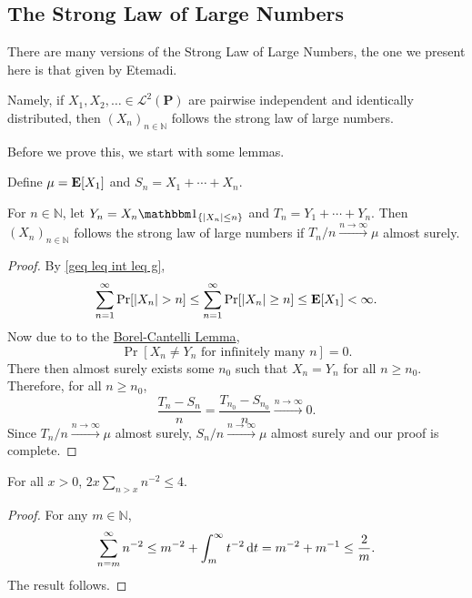 \subsection{The Strong Law of Large Numbers}

There are many versions of the Strong Law of Large Numbers, the one we present here is that given by Etemadi.

Namely, if $X_1,X_2,\ldots\in\mathcal{L}^2(\textbf{P})$ are pairwise independent and identically distributed, then $(X_n)_{n\in\mathbb{N}}$ follows the strong law of large numbers.

Before we prove this, we start with some lemmas.

Define $\mu=\textbf{E}[X_1]$ and $S_n=X_1+\cdots+X_n$.

\begin{lemma}
\label{prlem1etem}
    For $n\in\mathbb{N}$, let $Y_n=X_n\indic_{\{|X_n|\leq n\}}$ and $T_n=Y_1+\cdots+Y_n$. Then $(X_n)_{n\in\mathbb{N}}$ follows the strong law of large numbers if $T_n/n\xrightarrow{n\to\infty}\mu$ almost surely.
\end{lemma}
\begin{proof}
    By \cref{geq leq int leq g}, $$\sum_{n=1}^\infty \Pr[|X_n|> n]\leq\sum_{n=1}^\infty \Pr[|X_n|\geq n]\leq\expec[X_1]<\infty.$$ Now due to to the \hyperref[borelCantelliLemma]{Borel-Cantelli Lemma},
    $$\Pr[X_n\neq Y_n\text{ for infinitely many $n$}]=0.$$
    There then almost surely exists some $n_0$ such that $X_n=Y_n$ for all $n\geq n_0$. Therefore, for all $n\geq n_0$,
    $$\frac{T_n-S_n}{n} = \frac{T_{n_0}-S_{n_0}}{n}\xrightarrow{n\to\infty}0.$$
    Since $T_n/n\xrightarrow{n\to\infty}\mu$ almost surely, $S_n/n\xrightarrow{n\to\infty}\mu$ almost surely and our proof is complete.
\end{proof}

\begin{lemma}
    For all $x>0$, $2x\sum_{n>x}n^{-2}\leq 4$.
\end{lemma}
\begin{proof}
    For any $m\in\mathbb{N}$,
    $$\sum_{n=m}^\infty n^{-2} \leq m^{-2} + \int_m^\infty t^{-2}\operatorname{d}\!{t} = m^{-2} + m^{-1} \leq \frac{2}{m}.$$
    The result follows.
\end{proof}

